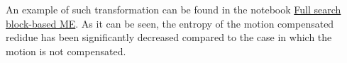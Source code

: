 An example of such transformation can be found in the notebook
\href{https://github.com/vicente-gonzalez-ruiz/motion_estimation/blob/main/src/motion_estimation/full_search_block_ME.ipynb}{Full
  search block-based ME}. As it can be seen, the entropy of the motion
compensated redidue has been significantly decreased compared to the
case in which the motion is not compensated.

\begin{comment}
\begin{figure}
  \centering
  \png{stockholm_R_block}{800}
  \caption{A tile of the first image of the \emph{Stockholm}
    sequence. This is the reference (${\mathbf R}$) frame.}
  \label{fig:R_block}
\end{figure}

\begin{figure}
  \centering
  \png{stockholm_P_block}{800}
  \caption{The same (coordinates) tile of the second image of the
    \emph{stockholm} sequence. This is the predicted (${\mathbf P}$)
    frame.}
  \label{fig:P_block}
\end{figure}

\begin{figure}
  \centering
  \png{stockholm_PR_block}{800}
  \caption{${\mathbf P} - {\mathbf R}$: shows the differences between
    both tiles. The entropy of the residue is displayed between
    parentheses.}
  \label{fig:RP_block}
\end{figure}

\begin{figure}
  \centering
  \png{stockholm_hat_P_block}{800}
  \caption{The prediction frame (${\hat{\mathbf P}}$). See \href{https://github.com/Sistemas-Multimedia/Sistemas-Multimedia.github.io/blob/master/milestones/09-ME/full_search_block_ME.ipynb}{this}.}
  \label{fig:hat_P_block}
\end{figure}

\begin{figure}
  \centering
  \png{stockholm_error_block}{800}
  \caption{The prediction-error frame
    (${\mathbf R} - {\hat{\mathbf P}}$). See
    \href{https://github.com/Sistemas-Multimedia/Sistemas-Multimedia.github.io/blob/master/milestones/09-ME/full_search_block_ME.ipynb}{this}.}
  \label{fig:error_block}
\end{figure}

As it can be seen in the Figures \ref{fig:R_block}, \ref{fig:P_block},
\ref{fig:RP_block}, \ref{fig:hat_P_block}, and \ref{fig:error_block}, the MVs generated
by block-based ME can significantly decrease the entropy.

\begin{figure}
  \centering
  \png{stockholm_MVs_block}{800}
  \caption{Motion vectors to map ${\mathbf P}$ (which is divided into
    disjoint blocks) onto ${\mathbf R}$. See
    \href{https://github.com/Sistemas-Multimedia/Sistemas-Multimedia.github.io/blob/master/milestones/09-ME/full_search_block_ME.ipynb}{this}.}
  \label{fig:MVs_block}
\end{figure}
\end{comment}

